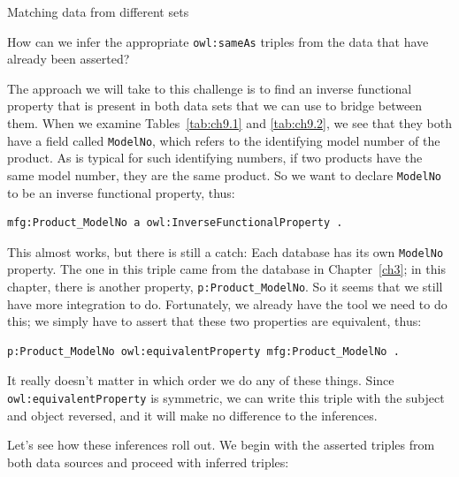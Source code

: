 \begin{challenge}{Matching data from different sets}

How can we infer the appropriate \texttt{owl:sameAs} triples from the data that
have already been asserted?

\solution

The approach we will take to this challenge is to find an inverse
functional property that is present in both data sets that we can use to
bridge between them. When we examine Tables~\ref{tab:ch9.1} and \ref{tab:ch9.2}, we see that
they both have a field called \texttt{ModelNo}, which refers to the identifying
model number of the product. As is typical for such identifying numbers,
if two products have the same model number, they are the same product.
So we want to declare \texttt{ModelNo} to be an inverse functional property,
thus:

\begin{lstlisting}
mfg:Product_ModelNo a owl:InverseFunctionalProperty .
\end{lstlisting}

This almost works, but there is still a catch: Each database has its own
\texttt{ModelNo} property. The one in this triple came from the database in
Chapter~\ref{ch3}; in this chapter, there is another property,
\texttt{p:Product\_ModelNo}. So it seems that we still have more integration to
do. Fortunately, we already have the tool we need to do this; we simply
have to assert that these two properties are equivalent, thus:

\begin{lstlisting}
p:Product_ModelNo owl:equivalentProperty mfg:Product_ModelNo .
\end{lstlisting}

It really doesn't matter in which order we do any of these things. Since
\texttt{owl:equivalentProperty} is symmetric, we can write this triple with the
subject and object reversed, and it will make no difference to the
inferences.

Let's see how these inferences roll out. We begin with the asserted
triples from both data sources and proceed with inferred triples:


\end{challenge}
